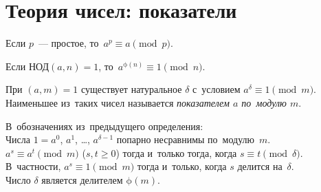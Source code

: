 \section*{Теория чисел: показатели}



\begingroup \providecommand\ifincludesolutions{\iffalse}

\begingroup
    \ifx\mathup\undefined
        \def\eulerphi{\upphi}
    \else
        \def\eulerphi{\mathrm{\phi}}
    \fi
    \def\divides{\mathrel{\vert}}

\ifincludesolutions
\subsection*{Версия с решениями}
\fi

Если $p$~--- простое, то~$a^p \equiv a \pmod{p}$.

Если $\text{НОД}(a, n) = 1$, то~$a^{\eulerphi(n)} \equiv 1 \pmod{n}$.

При $(a, m) = 1$ существует натуральное $\delta$ с~условием
$a^{\delta} \equiv 1 \pmod{m}$.
Наименьшее из~таких чисел называется \emph{показателем $a$ по~модулю $m$}.

\begin{problems}

\item
В~обозначениях из~предыдущего определения:
\\
\subproblem
Числа $1 = a^0$, $a^1$, \ldots, $a^{\delta-1}$ попарно несравнимы
по~модулю~$m$.
\\
\subproblem
$a^s \equiv a^t \pmod{m}$ ($s, t \geq 0$)
тогда и~только тогда, когда
$s \equiv t \pmod{\delta}$.
В~частности, $a^s \equiv 1 \pmod{m}$
тогда и~только, когда
$s$ делится на~$\delta$.
\\
\subproblem
{}%
Число $\delta$ является делителем $\eulerphi(m)$.

\end{problems}

\ifincludesolutions
\resetsubproblem
\subproblem
Пусть $a^s \equiv a^t \pmod{m}$.
Тогда $a^{t} (a^{s-t} - 1)$ делится на~$m$.
То есть $(a^{s-t} - 1)$ делится на~$m$.
Но~такого быть не~может, поскольку $0 < s - t < \delta$.
\par
\subproblem
Сначала докажем, что $a^s \equiv 1 \pmod{m}$ тогда и только тогда, когда
$s$ делится на~$\delta$.
Пусть это не~так.
Тогда $s = x \delta + r$.
Имеем, $1 \equiv a^s \equiv (a^{\delta})^x a^r \equiv a^r \pmod{m}$.
Но~такого быть не~может из~определения показателя.
Значит, $r = 0$ и~$s$ делится на~$\delta$ без остатка.
Отсюда сразу следует, что если $a^s \equiv a^t \pmod{m}$, то~$(a^{s-t} - 1)$
делится на~$m$, то~есть $(s - t)$ делится на~$\delta$.
\par
\subproblem
Очевидное следствие из~теоремы Эйлера и~предыдущего пункта.
\fi %

